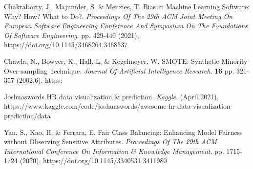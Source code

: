 \begin{thebibliography}{9}




Chakraborty, J., Majumder, S. \& Menzies, T. Bias in Machine Learning Software: Why? How? What to Do?. {\em Proceedings Of The 29th ACM Joint Meeting On European Software Engineering Conference And Symposium On The Foundations Of Software Engineering}. pp. 429-440 (2021), https://doi.org/10.1145/3468264.3468537


Chawla, N., Bowyer, K., Hall, L. \& Kegelmeyer, W. SMOTE: Synthetic Minority Over-sampling Technique. {\em Journal Of Artificial Intelligence Research}. \textbf{16} pp. 321-357 (2002,6), https:%

Joshuaswords HR data visualization \& prediction. {\em Kaggle}. (April 2021), https://www.kaggle.com/code/joshuaswords/awesome-hr-data-visualization-prediction/data

Yan, S., Kao, H. \& Ferrara, E. Fair Class Balancing: Enhancing Model Fairness without Observing Sensitive Attributes. {\em Proceedings Of The 29th ACM International Conference On Information \& Knowledge Management}. pp. 1715-1724 (2020), https://doi.org/10.1145/3340531.3411980



\end{thebibliography}





